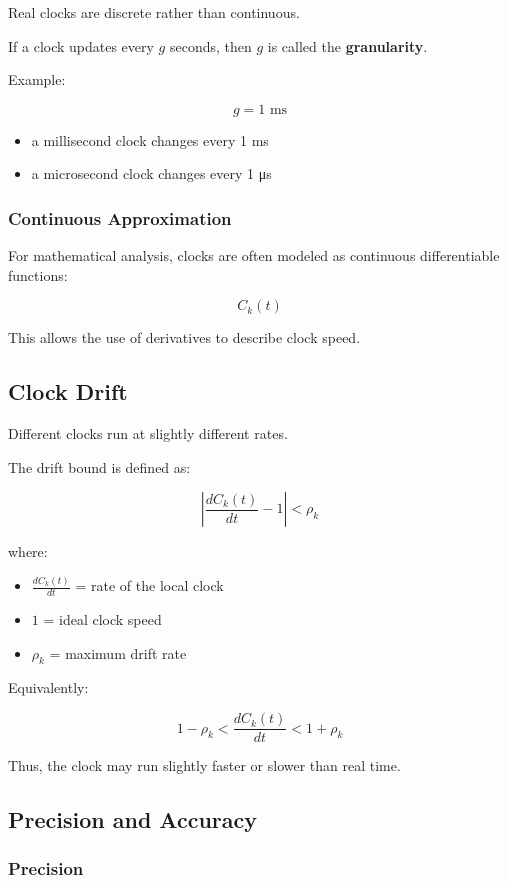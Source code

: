 Real clocks are discrete rather than continuous.

If a clock updates every \(g\) seconds, then \(g\) is called the
\textbf{granularity}.

Example:

\[
g = 1\text{ ms}
\]
\begin{itemize}
    \item a millisecond clock changes every 1 ms
    \item a microsecond clock changes every 1 μs
\end{itemize}

\subsubsection{Continuous Approximation}

For mathematical analysis, clocks are often modeled as continuous
differentiable functions:

\[
C_k(t)
\]

This allows the use of derivatives to describe clock speed.

\subsection{Clock Drift}

Different clocks run at slightly different rates.

The drift bound is defined as:

\[
\left|
\frac{dC_k(t)}{dt} - 1
\right|
<
\rho_k
\]

where:

\begin{itemize}
    \item \(\frac{dC_k(t)}{dt}\) = rate of the local clock
    \item \(1\) = ideal clock speed
    \item \(\rho_k\) = maximum drift rate
\end{itemize}

Equivalently:

\[
1 - \rho_k
<
\frac{dC_k(t)}{dt}
<
1 + \rho_k
\]

Thus, the clock may run slightly faster or slower than real time.

\subsection{Precision and Accuracy}

\subsubsection{Precision}

